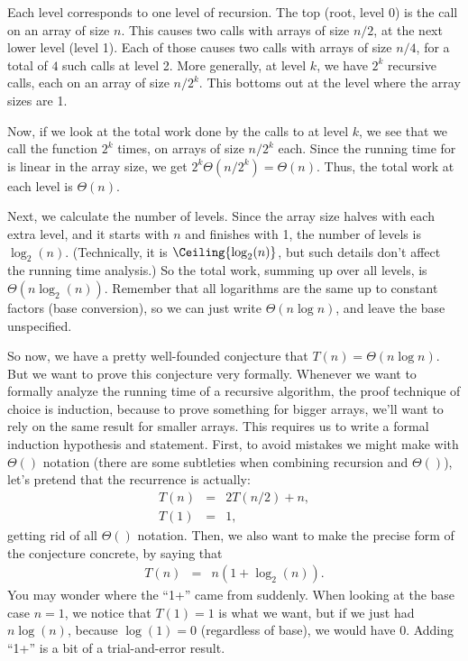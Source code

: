 Each level corresponds to one level of recursion. 
The top (root, level 0) is the call on an array of size $n$.
This causes two calls with arrays of size $n/2$, at the next lower
level (level 1).
Each of those causes two calls with arrays of size $n/4$, for a total
of $4$ such calls at level 2.
More generally, at level $k$, we have $2^k$ recursive calls, each on
an array of size $n/2^k$. 
This bottoms out at the level where the array sizes are 1.

Now, if we look at the total work done by the calls to  at
level $k$, we see that we call the function $2^k$ times, on arrays of
size $n/2^k$ each. Since the running time for  is linear
in the array size, we get $2^k \Theta(n/2^k) = \Theta(n)$. Thus, the
total work at each level is $\Theta(n)$.

Next, we calculate the number of levels. Since the array size halves
with each extra level, and it starts with $n$ and finishes with 1, the
number of levels is $\log_2(n)$. 
(Technically, it is $\Ceiling{\log_2(n)}$, but such details don't
affect the running time analysis.)
So the total work, summing up over all levels, is 
$\Theta(n \log_2(n))$. 
Remember that all logarithms are the same up to constant factors (base
conversion), so we can just write $\Theta(n \log n)$, and leave the
base unspecified.

So now, we have a pretty well-founded conjecture that
$T(n) = \Theta(n \log n)$. 
But we want to prove this conjecture very formally. 
Whenever we want to formally analyze the running time of a recursive
algorithm, the proof technique of choice is induction, because to
prove something for bigger arrays, we'll want to rely on the same
result for smaller arrays.
This requires us to write a formal induction hypothesis and
statement. 
First, to avoid mistakes we might make with $\Theta()$ notation (there
are some subtleties when combining recursion and $\Theta()$), let's
pretend that the recurrence is actually:
\begin{eqnarray*}
T(n) & = & 2T(n/2) + n,\\
T(1) & = & 1,
\end{eqnarray*}
getting rid of all $\Theta()$ notation.
Then, we also want to make the precise form of the conjecture
concrete, by saying that 
\begin{eqnarray*}
T(n) & = & n (1 + \log_2(n)).
\end{eqnarray*}
You may wonder where the ``1+'' came from suddenly. 
When looking at the base case $n=1$, we notice that $T(1)=1$ is what
we want, but if we just had $n \log(n)$, because $\log(1) = 0$
(regardless of base), we would have $0$. Adding ``1+'' is a bit of a
trial-and-error result.

